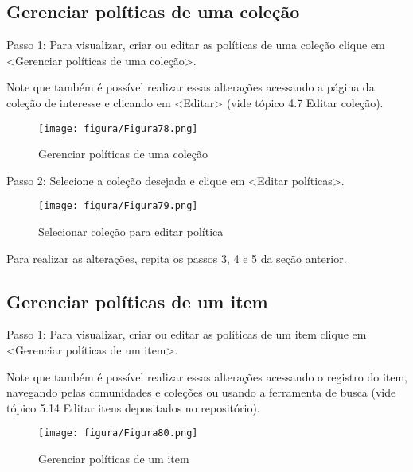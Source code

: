 \documentclass[12pt,hidelinks]{article}
\begin{document}
\newpage
    
    \subsection{Gerenciar políticas de uma coleção}
    
    Passo 1: Para visualizar, criar ou editar as políticas de uma coleção clique em <Gerenciar políticas de uma coleção>.
    
    Note que também é possível realizar essas alterações acessando a página da coleção de interesse e clicando em <Editar> (vide tópico 4.7 Editar coleção).
    
    \begin{figure}[!htp]
                \centering
                \texttt{[image: figura/Figura78.png]}
                \caption{Gerenciar políticas de uma coleção}
            \label{Rotulo}
        \end{figure}
    
    Passo 2: Selecione a coleção desejada e clique em <Editar políticas>.
    
    \begin{figure}[!htp]
                \centering
                \texttt{[image: figura/Figura79.png]}
                \caption{Selecionar coleção para editar política}
            \label{Rotulo}
        \end{figure}
        
    Para realizar as alterações, repita os passos 3, 4 e 5 da seção anterior.

\newpage

    \subsection{Gerenciar políticas de um item}
    
    Passo 1: Para visualizar, criar ou editar as políticas de um item clique em <Gerenciar políticas de um item>.
    
    \singlespacing
    
    Note que também é possível realizar essas alterações acessando o registro do item, navegando pelas comunidades e coleções ou usando a ferramenta de busca (vide tópico 5.14 Editar itens depositados no repositório).
    
    \begin{figure}[!htp]
                \centering
                \texttt{[image: figura/Figura80.png]}
                \caption{Gerenciar políticas de um item}
            \label{Rotulo}
        \end{figure}
    
\end{document}
